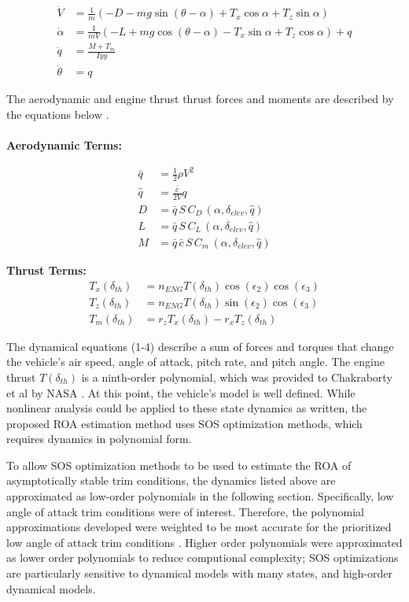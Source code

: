 \documentclass[%
 reprint,
 amsmath,amssymb,
 aps,
]{revtex4-2}
\begin{document}
\begin{align}     
        \dot{V} &= \frac{1}{m}\left(-D - m g \sin{(\theta - \alpha)} + T_x \cos{\alpha} + T_z \sin{\alpha} \right) \\
        \dot{\alpha} &= \frac{1}{m V}\left(-L + m g \cos{(\theta - \alpha)} - T_x \sin{\alpha} + T_z \cos{\alpha}\right) + q \\
        \dot{q} &= \frac{M + T_m}{Iyy} \\
        \dot{\theta} &= q
\end{align}

The aerodynamic and engine thrust thrust forces and moments are described by the equations below \cite{primary}. \\ \\
\textbf{Aerodynamic Terms:}

 \begin{align}
        \bar{q} &= \frac{1}{2} \rho V^2 \\ 
        \hat{q} &= \frac{\bar{c}}{2 V} q  \\ 
        D &= \bar{q}\, S\, C_D\, (\alpha, \delta_{elev}, \hat{q})  \\ 
        L &= \bar{q}\, S\, C_L\, (\alpha, \delta_{elev}, \hat{q})  \\ 
        M &= \bar{q}\, \bar{c}\, S\, C_m\, (\alpha, \delta_{elev}, \hat{q}) 
\end{align}


\textbf{Thrust Terms:}
\begin{align}
    T_x(\delta_{th}) &= n_{ENG} T(\delta_{th}) \cos{(\epsilon_2)} \cos{(\epsilon_3)} \\ 
    T_z(\delta_{th}) &= n_{ENG} T(\delta_{th}) \sin{(\epsilon_2)} \cos{(\epsilon_3)} \\ 
    T_m(\delta_{th}) & = r_z T_x(\delta_{th}) - r_x T_z(\delta_{th})
\end{align}

The dynamical equations (1-4) describe a sum of forces and torques that change the vehicle's air speed, angle of attack, pitch rate, and pitch angle. The engine thrust $T(\delta_{th})$ is a ninth-order polynomial, which was provided to Chakraborty et al by NASA \cite{primary}. At this point, the vehicle's model is well defined. While nonlinear analysis could be applied to these state dynamics as written, the proposed ROA estimation method uses SOS optimization methods, which requires dynamics in polynomial form. 

To allow SOS optimization methods to be used to estimate the ROA of asymptotically stable trim conditions, the dynamics listed above are approximated as low-order polynomials in the following section. Specifically, low angle of attack trim conditions were of interest. Therefore, the polynomial approximations developed were weighted to be most accurate for the prioritized low angle of attack trim conditions \cite{primary}. Higher order polynomials were approximated as lower order polynomials to reduce computional complexity; SOS optimizations are particularly sensitive to dynamical models with many states, and high-order dynamical models.
\end{document}
